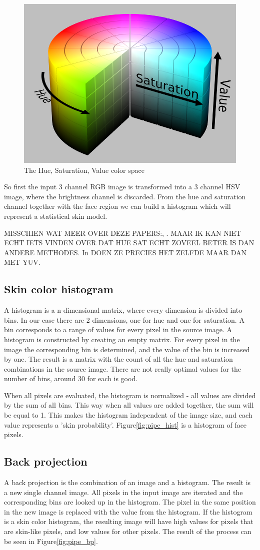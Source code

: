 \begin{figure}[htbp]
	\center
	\includegraphics[width=0.4\linewidth]{figures/hsv.png}
	\caption{The Hue, Saturation, Value color space}
	\label{fig:hsv}
\end{figure}

So first the input 3 channel RGB image is transformed into a 3 channel HSV image, where the brightness channel is discarded. From the hue and saturation channel together with the face region we can build a histogram which will represent a statistical skin model.


MISSCHIEN WAT MEER OVER DEZE PAPERS:\cite{Bradski1998}, \cite{Cooper2007}. MAAR IK KAN NIET ECHT IETS VINDEN OVER DAT HUE SAT ECHT ZOVEEL BETER IS DAN ANDERE METHODES. In \cite{Stenger2006} DOEN ZE PRECIES HET ZELFDE MAAR DAN MET YUV.


\subsection*{Skin color histogram}
A histogram is a n-dimensional matrix, where every dimension is divided into bins. In our case there are 2 dimensions, one for hue and one for saturation. A bin corresponds to a range of values for every pixel in the source image. A histogram is constructed by creating an empty matrix. For every pixel in the image the corresponding bin is determined, and the value of the bin is increased by one. The result is a matrix with the count of all the hue and saturation combinations in the source image. There are not really optimal values for the number of bins, around 30 for each is good.

When all pixels are evaluated, the histogram is normalized - all values are divided by the sum of all bins. This way when all values are added together, the sum will be equal to 1. This makes the histogram independent of the image size, and each value represents a 'skin probability'. Figure\ref{fig:pipe_hist} is a histogram of face pixels.

\subsection*{Back projection}
A back projection is the combination of an image and a histogram. The result is a new single channel image. All pixels in the input image are iterated and the corresponding bins are looked up in the histogram. The pixel in the same position in the new image is replaced with the value from the histogram. If the histogram is a skin color histogram, the resulting image will have high values for pixels that are skin-like pixels, and low values for other pixels. The result of the process can be seen in Figure\ref{fig:pipe_bp}.


